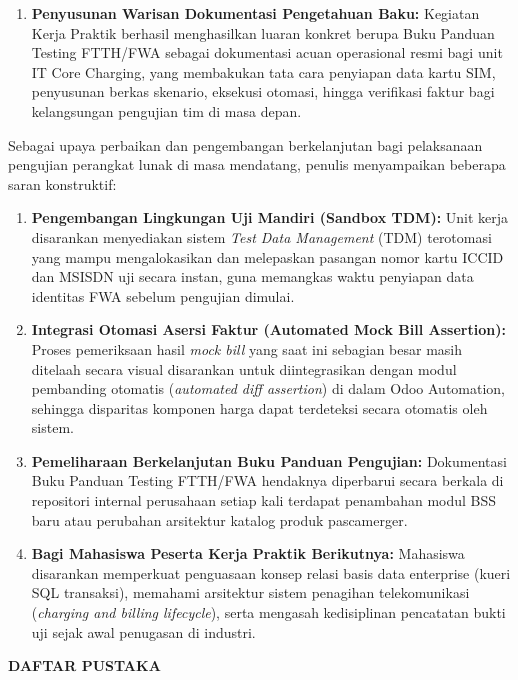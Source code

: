 \documentclass[12pt,a4paper]{article}
\begin{document}
\begin{enumerate}[label=\arabic*.,leftmargin=1.5em,itemsep=3pt,topsep=2pt]
    \item \textbf{Penyusunan Warisan Dokumentasi Pengetahuan Baku:} Kegiatan Kerja Praktik berhasil menghasilkan luaran konkret berupa Buku Panduan Testing FTTH/FWA sebagai dokumentasi acuan operasional resmi bagi unit IT Core Charging, yang membakukan tata cara penyiapan data kartu SIM, penyusunan berkas skenario, eksekusi otomasi, hingga verifikasi faktur bagi kelangsungan pengujian tim di masa depan.
\end{enumerate}

\vspace{0.4cm}
Sebagai upaya perbaikan dan pengembangan berkelanjutan bagi pelaksanaan pengujian perangkat lunak di masa mendatang, penulis menyampaikan beberapa saran konstruktif:
\begin{enumerate}[label=\arabic*.,leftmargin=1.5em,itemsep=3pt,topsep=2pt]
    \item \textbf{Pengembangan Lingkungan Uji Mandiri (Sandbox TDM):} Unit kerja disarankan menyediakan sistem \textit{Test Data Management} (TDM) terotomasi yang mampu mengalokasikan dan melepaskan pasangan nomor kartu ICCID dan MSISDN uji secara instan, guna memangkas waktu penyiapan data identitas FWA sebelum pengujian dimulai.
    \item \textbf{Integrasi Otomasi Asersi Faktur (Automated Mock Bill Assertion):} Proses pemeriksaan hasil \textit{mock bill} yang saat ini sebagian besar masih ditelaah secara visual disarankan untuk diintegrasikan dengan modul pembanding otomatis (\textit{automated diff assertion}) di dalam Odoo Automation, sehingga disparitas komponen harga dapat terdeteksi secara otomatis oleh sistem.
    \item \textbf{Pemeliharaan Berkelanjutan Buku Panduan Pengujian:} Dokumentasi Buku Panduan Testing FTTH/FWA hendaknya diperbarui secara berkala di repositori internal perusahaan setiap kali terdapat penambahan modul BSS baru atau perubahan arsitektur katalog produk pascamerger.
    \item \textbf{Bagi Mahasiswa Peserta Kerja Praktik Berikutnya:} Mahasiswa disarankan memperkuat penguasaan konsep relasi basis data enterprise (kueri SQL transaksi), memahami arsitektur sistem penagihan telekomunikasi (\textit{charging and billing lifecycle}), serta mengasah kedisiplinan pencatatan bukti uji sejak awal penugasan di industri.
\end{enumerate}

\clearpage
\begin{center}
    {\bfseries\large DAFTAR PUSTAKA\par}
\end{center}
\vspace{0.6cm}
\end{document}
